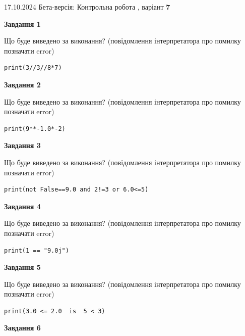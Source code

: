 \documentclass[12pt, ukrainian]{article}
\begin{document}
{\Large{17.10.2024 Бета-версія: Контрольна робота , варіант  \No \textbf { 7 }\par}}
{
\begin {large}
{\begin {center}\textbf{Завдання 1}\end {center}}

Що буде виведено за виконання? (повідомлення інтерпретатора про помилку позначати error)\par
\begin{verbatim}
print(3//3//8*7)
\end{verbatim}

{\begin {center}\textbf{Завдання 2}\end {center}}

Що буде виведено за виконання? (повідомлення інтерпретатора про помилку позначати error)\par
\begin{verbatim}
print(9**-1.0*-2)
\end{verbatim}

{\begin {center}\textbf{Завдання 3}\end {center}}

Що буде виведено за виконання? (повідомлення інтерпретатора про помилку позначати error)\par
\begin{verbatim}
print(not False==9.0 and 2!=3 or 6.0<=5)
\end{verbatim}

{\begin {center}\textbf{Завдання 4}\end {center}}

Що буде виведено за виконання? (повідомлення інтерпретатора про помилку позначати error)\par
\begin{verbatim}
print(1 == "9.0j")
\end{verbatim}

{\begin {center}\textbf{Завдання 5}\end {center}}

Що буде виведено за виконання? (повідомлення інтерпретатора про помилку позначати error)\par
\begin{verbatim}
print(3.0 <= 2.0  is  5 < 3)
\end{verbatim}

{\begin {center}\textbf{Завдання 6}\end {center}}


\end{large}}
\end{document}
